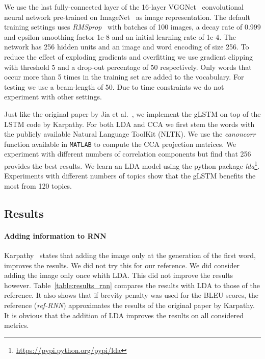 \documentclass[twoside,twocolumn]{article}
\begin{document}
We use the last fully-connected layer of the 16-layer VGGNet~\cite{Arge2015} convolutional neural network pre-trained on ImageNet~\cite{Russakovsky2014} as image representation.
The default training settings uses \emph{RMSprop}~\cite{RMSprop} with batches of 100 images, a decay rate of 0.999 and epsilon smoothing factor 1e-8 and an initial learning rate of 1e-4. The network has 256 hidden units and an image and word encoding of size 256.
To reduce the effect of exploding gradients and overfitting we use gradient clipping with threshold 5 and a drop-out percentage of 50 respectively.
Only words that occur more than 5 times in the training set are added to the vocabulary. For testing we use a beam-length of 50.
Due to time constraints we do not experiment with other settings.

Just like the original paper by Jia et al.~\cite{Fernando2015}, we implement the gLSTM on top of the LSTM code by Karpathy.
For both LDA and CCA we first stem the words with the publicly available Natural Language ToolKit (NLTK)\cite{bird2009natural}.
We use the \emph{canoncorr} function available in \texttt{MATLAB} to compute the CCA projection matrices. We experiment with different numbers of correlation components but find that 256 provides the best results.
We learn an LDA model using the python package \emph{lda}\footnote{\url{https://pypi.python.org/pypi/lda}}. 
Experiments with different numbers of topics show that the gLSTM benefits the most from 120 topics.


\subsection{Results}
\paragraph{Adding information to RNN}
Karpathy~\cite{Karpathy2015} states that adding the image only at the generation of the first word, improves the results. 
We did not try this for our reference. We did consider adding the image only once whith LDA. This did not improve the results however.
Table~\ref{table:results_rnn} compares the results with LDA to those of the reference. It also shows that if brevity penalty was used for the BLEU scores, the reference (\emph{ref-RNN}) approximates the results of the original paper by Karpathy. 
It is obvious that the addition of LDA improves the results on all considered metrics.
\end{document}
